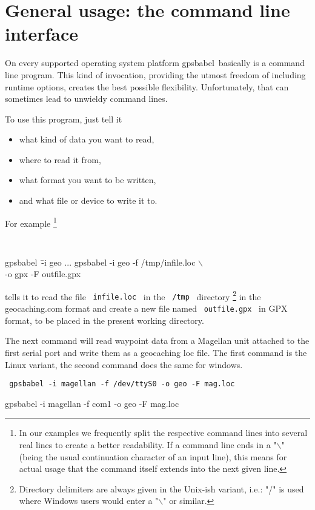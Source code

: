 \documentclass[12pt]{article}
\newcommand{\gpsbabel}{{\sc gpsbabel}}
\newcommand{\bsl}{$\backslash$}
\begin{document}
\section{General usage: the command line interface}

On every supported operating system platform \gpsbabel\ basically is a command line program. This kind of invocation, providing the utmost freedom of including runtime options, creates the best possible flexibility. Unfortunately, that can
sometimes lead to unwieldy command lines.

To use this program, just tell it
\begin{itemize}
\item  what kind of data you want to read, 
\item where to read it from,
\item what format you want to be written,
\item and what file or device to write it to.
\end{itemize}

For example%
\footnote{In our examples we frequently split the respective command lines into several real lines to create a better readability. If a command line ends in a "\bsl " (being the usual continuation character of an input line), this means for actual usage that the command itself extends into the next given line.}

{\tt \small
\begin{tabbing}
gpsbabel~\= -i geo ... \kill
gpsbabel \> -i geo -f /tmp/infile.loc \+ \bsl \\
						-o gpx -F outfile.gpx
\end{tabbing}
}

tells it to read the file ~{\tt infile.loc}~ in the ~{\tt /tmp}~ directory%
\footnote{Directory delimiters are always given in the Unix-ish variant, i.e.: "/" is used where Windows users would enter a "\bsl" or similar.} in the {\sc geocaching.com} format and create a new file named ~{\tt outfile.gpx}~ in GPX format, to be placed in the present working directory.

The next command will read waypoint data from a Magellan unit attached to the first
serial port and write them as a geocaching loc file.  The first command is the Linux variant, the second command does the same for windows.

{\tt \small
gpsbabel -i magellan -f /dev/ttyS0 -o geo -F mag.loc

gpsbabel -i magellan -f com1 -o geo -F mag.loc
}	
\end{document}
